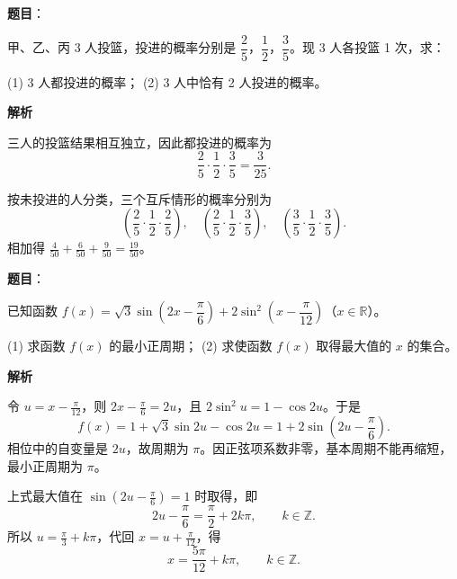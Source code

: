 \begin{answer}

\textbf{题目}：

甲、乙、丙 3 人投篮，投进的概率分别是 $\dfrac25\text{，}\dfrac12\text{，}\dfrac35$。现 3 人各投篮 1 次，求：

(1) 3 人都投进的概率；
(2) 3 人中恰有 2 人投进的概率。

\textbf{解析}


三人的投篮结果相互独立，因此都投进的概率为
\nopagebreak[4]
\[
\frac25\cdot\frac12\cdot\frac35=\frac{3}{25}.
\]


按未投进的人分类，三个互斥情形的概率分别为
\nopagebreak[4]
\[
\left(\frac25\cdot\frac12\cdot\frac25\right),\quad
\left(\frac25\cdot\frac12\cdot\frac35\right),\quad
\left(\frac35\cdot\frac12\cdot\frac35\right).
\]
相加得 $\frac{4}{50}+\frac{6}{50}+\frac{9}{50}=\frac{19}{50}$。



\end{answer}
\begin{answer}

\textbf{题目}：

已知函数 \(f(x)=\sqrt3\sin\left(2x-\dfrac\pi6\right)+2\sin^2\left(x-\dfrac\pi{12}\right)\)（\(x\in\mathbb R\)）。

(1) 求函数 \(f(x)\) 的最小正周期；
(2) 求使函数 \(f(x)\) 取得最大值的 \(x\) 的集合。

\textbf{解析}


令 $u=x-\tfrac\pi{12}$，则 $2x-\tfrac\pi6=2u$，且 $2\sin^2u=1-\cos2u$。于是
\nopagebreak[4]
\[
f(x)=1+\sqrt3\sin2u-\cos2u=1+2\sin\left(2u-\frac\pi6\right).
\]
相位中的自变量是 $2u$，故周期为 $\pi$。因正弦项系数非零，基本周期不能再缩短，最小正周期为 $\pi$。


上式最大值在 $\sin(2u-\tfrac\pi6)=1$ 时取得，即
\nopagebreak[4]
\[
2u-\frac\pi6=\frac\pi2+2k\pi,\qquad k\in\mathbb Z.
\]
所以 $u=\tfrac\pi3+k\pi$，代回 $x=u+\tfrac\pi{12}$，得
\nopagebreak[4]
\[
x=\frac{5\pi}{12}+k\pi,\qquad k\in\mathbb Z.
\]



\end{answer}
